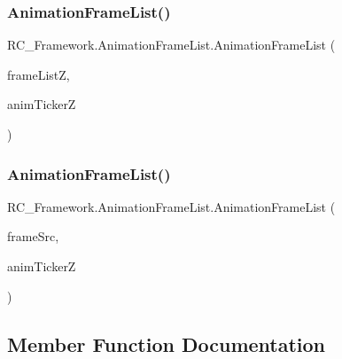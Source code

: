 \subsubsection{\texorpdfstring{Animation\+Frame\+List()}{AnimationFrameList()}\hspace{0.1cm}{\footnotesize\ttfamily [1/2]}}
{\footnotesize\ttfamily R\+C\+\_\+\+Framework.\+Animation\+Frame\+List.\+Animation\+Frame\+List (\begin{DoxyParamCaption}\item[{\mbox{\hyperlink{class_r_c___framework_1_1_frame_list}{Frame\+List}}}]{frame\+ListZ,  }\item[{\mbox{\hyperlink{class_r_c___framework_1_1_animation_ticker}{Animation\+Ticker}}}]{anim\+TickerZ }\end{DoxyParamCaption})}

\mbox{\label{class_r_c___framework_1_1_animation_frame_list_aa04cc11efd6dbb3cb04b4e67f63fc670}} 
\subsubsection{\texorpdfstring{Animation\+Frame\+List()}{AnimationFrameList()}\hspace{0.1cm}{\footnotesize\ttfamily [2/2]}}
{\footnotesize\ttfamily R\+C\+\_\+\+Framework.\+Animation\+Frame\+List.\+Animation\+Frame\+List (\begin{DoxyParamCaption}\item[{\mbox{\hyperlink{class_r_c___framework_1_1_frame_source}{Frame\+Source}}}]{frame\+Src,  }\item[{\mbox{\hyperlink{class_r_c___framework_1_1_animation_ticker}{Animation\+Ticker}}}]{anim\+TickerZ }\end{DoxyParamCaption})}



\subsection{Member Function Documentation}
\mbox{\label{class_r_c___framework_1_1_animation_frame_list_aa253565464d98bf955c81702fd3d66a4}} 
